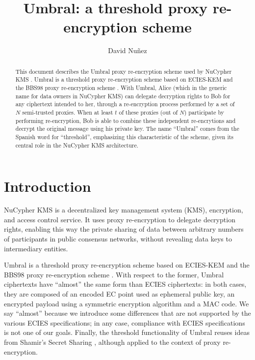 \documentclass{amsart}
\title{Umbral: a threshold proxy re-encryption scheme}
\author{David Nuñez}
\date{} %
\begin{document}
\maketitle

\begin{abstract}
This document describes the Umbral proxy re-encryption scheme used by NuCypher KMS \cite{egorov2017nucypherkms}. 
Umbral is a threshold proxy re-encryption scheme based on ECIES-KEM \cite{ansi-x9.63} and the BBS98 proxy re-encryption scheme  \cite{blaze1998divertible}. 
With Umbral, Alice (which in the generic name for data owners in NuCypher KMS) can delegate decryption rights to Bob for any ciphertext intended to her, through a re-encryption process performed by a set of $N$ semi-trusted proxies. When at least $t$ of these proxies (out of $N$) participate by performing re-encryption, Bob is able to combine these independent re-encrytions and decrypt the original message using his private key. 
The name ``Umbral'' comes from the Spanish word for ``threshold'', emphasizing this characteristic of the scheme, given its central role in the NuCypher KMS architecture. 
\end{abstract}



\section{Introduction}

NuCypher KMS \cite{egorov2017nucypherkms} is a decentralized key management system (KMS), encryption, and access control service. 
It uses proxy re-encryption to delegate decryption rights, enabling this way the private sharing of data between arbitrary numbers of participants in public consensus networks, without revealing data keys to intermediary entities. 

Umbral is a threshold proxy re-encryption scheme based on ECIES-KEM \cite{ansi-x9.63} and the BBS98 proxy re-encryption scheme \cite{blaze1998divertible}. With respect to the former, Umbral ciphertexts have ``almost'' the same form than ECIES ciphertexts: in both cases, they are composed of an encoded EC point used as ephemeral public key, an encrypted payload using a symmetric encryption algorithm and a MAC code. We say ``almost'' because we introduce some differences that are not supported by the various ECIES specifications; in any case, compliance with ECIES specifications is not one of our goals. 
Finally, the threshold functionality of Umbral reuses ideas from Shamir's Secret Sharing \cite{shamir1979share}, although applied to the context of proxy re-encryption. 
\end{document}

